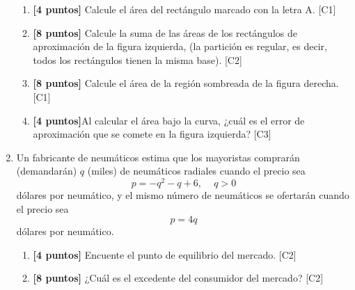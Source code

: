 \documentclass[10pt]{exam}
\begin{document}
\begin{enumerate}
\begin{enumerate}
    \item \textbf{[4 puntos]} Calcule el área del rectángulo marcado con la letra A. \hfill{[C1]}
    \item \textbf{[8 puntos]} Calcule la suma de las áreas de los rectángulos de aproximación de la figura izquierda, (la partición es regular, es decir, todos los rectángulos tienen la misma base). \hfill{[C2]}
    \item \textbf{[8 puntos]} Calcule el área de la región sombreada de la figura derecha. \hfill{[C1]}

    \item \textbf{[4 puntos]}Al calcular el área bajo la curva, ¿cuál es el error de aproximación que se comete en la figura izquierda?  \hfill{[C3]}


\end{enumerate}

\item Un fabricante de neumáticos estima que los mayoristas comprarán (demandarán) $q$ (miles) de neumáticos radiales cuando el precio sea $$p=-q^2-q+6,\,\,\,\,\,\,\, q>0$$
dólares por neumático, y el mismo número de neumáticos se ofertarán cuando el precio sea $$p=4q$$
dólares por neumático.

\begin{enumerate}
    \item \textbf{[4 puntos]} Encuente el punto de equilibrio del mercado. \hfill{[C2]}
    
    \item \textbf{[8 puntos]} ¿Cuál es el excedente del consumidor del mercado? \hfill{[C2]}
\end{enumerate}

\end{enumerate}
\end{document}
